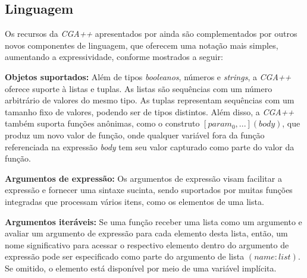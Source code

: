 \begin{figure}[h!]
	\centering
	\captionsetup{width=13cm}
	{}
\end{figure}

\newpage

\subsection{Linguagem}
\label{sec:linguagem_cga++}

Os recursos da \textit{CGA++} apresentados por  ainda são complementados por outros novos componentes de linguagem, que oferecem uma notação mais simples, aumentando a expressividade, conforme mostrados a seguir:

\textbf{Objetos suportados:} Além de tipos \textit{booleanos}, números e \textit{strings}, a \textit{CGA++} oferece suporte à listas e tuplas. As listas são sequências com um número arbitrário de valores do mesmo tipo. As tuplas representam sequências com um tamanho fixo de valores, podendo ser de tipos distintos. Além disso, a \textit{CGA++} também suporta funções anônimas, como o construto $[param_0, ...](body)$, que produz um novo valor de função, onde qualquer variável fora da função referenciada na expressão \textit{body} tem seu valor capturado como parte do valor da função.

\textbf{Argumentos de expressão:} Os argumentos de expressão visam facilitar a expressão e fornecer uma sintaxe sucinta, sendo suportados por muitas funções integradas que processam vários itens, como os elementos de uma lista.

\textbf{Argumentos iteráveis:} Se uma função receber uma lista como um argumento e avaliar um argumento de expressão para cada elemento desta lista, então, um nome significativo para acessar o respectivo elemento dentro do argumento de expressão pode ser especificado como parte do argumento de lista $(name:list)$. Se omitido, o elemento está disponível por meio de uma variável implícita.


